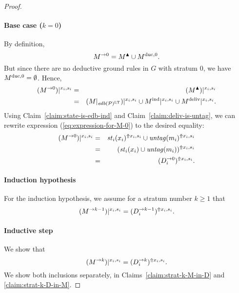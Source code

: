 \documentclass{tlp}
\newcommand{\ded}{\mathcal{P}}
\newcommand{\proj}[2]{#1|_{#2}}
\newcommand{\edb}[1]{\fname{edb}(#1)}
\newcommand{\sh}[1]{(#1)}
\newcommand{\toloct}[1]{#1^{\mathrm{LT}}}
\newcommand{\addlt}[3]{#1^{\Uparrow#2,#3}}
\newcommand{\projlt}[3]{#1|^{#2,#3}}
\newcommand{\shprojlt}[3]{\projlt{\sh{#1}}{#2}{#3}}
\newcommand{\shaddlt}[3]{\addlt{\sh{#1}}{#2}{#3}}
\newcommand{\cnfs}{\mathit{st}}
\newcommand{\untag}[1]{\fname{untag}(#1)}
\newcommand{\grded}{G}
\begin{document}
\begin{appendix}
\begin{proof}
\paragraph*{Base case ($k=0$)}

By definition, 
\[
M^{\to0}=M^{\blacktriangle}\cup M^{\mathrm{duc},0}.
\]
But since there are no deductive ground rules in $\grded$ with stratum
$0$, we have $M^{\mathrm{duc},0}=\emptyset$. Hence, 
\begin{eqnarray}
\shprojlt{\strat M0}{x_{i}}{s_{i}} & = & \shprojlt{\up M}{x_{i}}{s_{i}}\nonumber \\
 & = & \shprojlt{\proj M{\toloct{\edb{\ded}}}}{x_{i}}{s_{i}}\cup\projlt{\ind M}{x_{i}}{s_{i}}\cup\projlt{\deliv M}{x_{i}}{s_{i}}.\label{eq:expression-for-M-0}
\end{eqnarray}
Using Claim~\ref{claim:state-is-edb-ind} and Claim~\ref{claim:deliv-is-untag},
we can rewrite expression (\ref{eq:expression-for-M-0}) to the desired
equality: 
\begin{eqnarray*}
\shprojlt{\strat M0}{x_{i}}{s_{i}} & = & \addlt{\cnfs_{i}(x_{i})}{x_{i}}{s_{i}}\cup\addlt{\untag{m_{i}}}{x_{i}}{s_{i}}\\
 & = & \shaddlt{\cnfs_{i}(x_{i})\cup\untag{m_{i}}}{x_{i}}{s_{i}}\\
 & = & \shaddlt{\strat{D_{i}}0}{x_{i}}{s_{i}}.
\end{eqnarray*}



\paragraph*{Induction hypothesis}

For the induction hypothesis, we assume for a stratum number $k\geq1$
that 
\[
\shprojlt{\strat M{k-1}}{x_{i}}{s_{i}}=\shaddlt{\strat{D_{i}}{k-1}}{x_{i}}{s_{i}}.
\]



\paragraph*{Inductive step}

We show that 
\[
\shprojlt{\strat Mk}{x_{i}}{s_{i}}=\shaddlt{\strat{D_{i}}k}{x_{i}}{s_{i}}.
\]
We show both inclusions separately, in Claims~\ref{claim:strat-k-M-in-D}
and \ref{claim:strat-k-D-in-M}. \end{proof}



\tline




\end{appendix}
\end{document}
